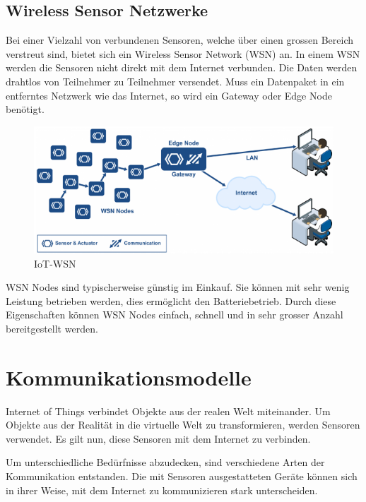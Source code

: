 \subsection{Wireless Sensor Netzwerke}
Bei einer Vielzahl von verbundenen Sensoren, welche über einen grossen Bereich verstreut sind, bietet sich ein Wireless Sensor Network (WSN) an. In einem WSN werden die Sensoren nicht direkt mit dem Internet verbunden. Die Daten werden drahtlos von Teilnehmer zu Teilnehmer versendet. Muss ein Datenpaket in ein entferntes Netzwerk wie das Internet, so wird ein Gateway oder Edge Node benötigt.
\begin{figure}[H]
\centering
\includegraphics[scale=0.8]{../02_Analyse/images/iot_wsn_lan_overview_by_micrium.png}
\caption{IoT-WSN\cite{IoTWSN}}
\end{figure}
WSN Nodes sind typischerweise günstig im Einkauf. Sie können mit sehr wenig Leistung betrieben werden, dies ermöglicht den Batteriebetrieb. Durch diese Eigenschaften können WSN Nodes einfach, schnell und in sehr grosser Anzahl bereitgestellt werden. 
\newpage
\section{Kommunikationsmodelle}
Internet of Things verbindet Objekte aus der realen Welt miteinander. Um Objekte aus der Realität in die virtuelle Welt zu transformieren, werden Sensoren verwendet. Es gilt nun, diese Sensoren mit dem Internet zu verbinden.

Um unterschiedliche Bedürfnisse abzudecken, sind verschiedene Arten der Kommunikation entstanden. Die mit Sensoren ausgestatteten Geräte können sich in ihrer Weise, mit dem Internet zu kommunizieren stark unterscheiden.
